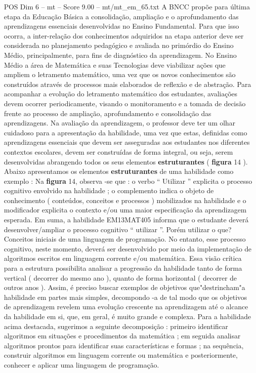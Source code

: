 \begin{textsample}{POS Dim 6 – mt – Score 9.00 – mt/mt\_em\_65.txt}
A BNCC propõe para última etapa da Educação Básica a consolidação, ampliação e o aprofundamento das aprendizagens essenciais desenvolvidas no Ensino Fundamental.
Para que isso ocorra, a inter-relação dos conhecimentos adquiridos na etapa anterior deve ser considerada no planejamento pedagógico e avaliada no primórdio do Ensino Médio, principalmente, para fins de diagnóstico da aprendizagem.
No Ensino Médio a área de Matemática e suas Tecnologias deve viabilizar ações que ampliem o letramento matemático, uma vez que os novos conhecimentos são construídos através de processos mais elaborados de reflexão e de abstração.
Para acompanhar a evolução do letramento matemático dos estudantes, avaliações devem ocorrer periodicamente, visando o monitoramento e a tomada de decisão frente ao processo de ampliação, aprofundamento e consolidação das aprendizagens.
Na avaliação da aprendizagem, o professor deve ter um olhar cuidadoso para a apresentação da habilidade, uma vez que estas, definidas como aprendizagens essenciais que devem ser asseguradas aos estudantes nos diferentes contextos escolares, devem ser construídas de forma integral, ou seja, serem desenvolvidas abrangendo todos os seus elementos \textbf{estruturantes} ( \textbf{figura} 14 ).
Abaixo apresentamos os elementos \textbf{estruturantes} de uma habilidade como exemplo : Na \textbf{figura} 14, observa -se que : o verbo “ Utilizar ” explicita o processo cognitivo envolvido na habilidade ; o complemento indica o objeto de conhecimento ( conteúdos, conceitos e processos ) mobilizados na habilidade e o modificador explicita o contexto e/ou uma maior especificação da aprendizagem esperada.
Em suma, a habilidade EM13MAT405 informa que o estudante deverá desenvolver/ampliar o processo cognitivo “ utilizar ”.
Porém utilizar o que?
Conceitos iniciais de uma linguagem de programação.
No entanto, esse processo cognitivo, neste momento, deverá ser desenvolvido por meio da implementação de algoritmos escritos em linguagem corrente e/ou matemática.
Essa visão crítica para a estrutura possibilita analisar a progressão da habilidade tanto de forma vertical ( decorrer do mesmo ano ), quanto de forma horizontal ( decorrer de outros anos ).
Assim, é preciso buscar exemplos de objetivos que"destrincham"a habilidade em partes mais simples, decompondo -a de tal modo que os objetivos de aprendizagem revelem uma evolução crescente na aprendizagem até o alcance da habilidade em si, que, em geral, é muito grande e complexa.
Para a habilidade acima destacada, sugerimos a seguinte decomposição : primeiro identificar algoritmos em situações e procedimentos da matemática ; em seguida analisar algoritmos prontos para identificar suas características e formas ; na sequência, construir algoritmos em linguagem corrente ou matemática e posteriormente, conhecer e aplicar uma linguagem de programação.

\end{textsample}
